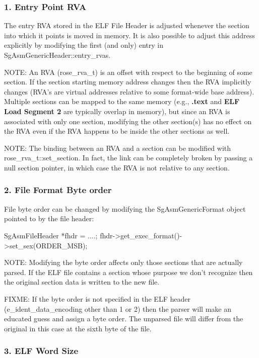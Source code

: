 \subsubsection{1. Entry Point RVA}

   The entry RVA stored in the ELF File Header is adjusted whenever the section into which it points is moved in memory. It is
   also possible to adjust this address explicitly by modifying the first (and only) entry in SgAsmGenericHeader::entry\_rvas.

   NOTE: An RVA (rose\_rva\_t) is an offset with respect to the beginning of some section. If the section starting memory address
   changes then the RVA implicitly changes (RVA's are virtual addresses relative to some format-wide base address). Multiple
   sections can be mapped to the same memory (e.g., {\bf.text} and {\bf ELF Load Segment 2} are typically overlap in memory), but
   since an RVA is associated with only one section, modifying the other section(s) has no effect on the RVA even if the RVA
   happens to be inside the other sections as well.

   NOTE: The binding between an RVA and a section can be modified with rose\_rva\_t::set\_section. In fact, the link can be
   completely broken by passing a null section pointer, in which case the RVA is not relative to any section.

\subsubsection{2. File Format Byte order}

   File byte order can be changed by modifying the SgAsmGenericFormat object pointed to by the file header:

      SgAsmFileHeader *fhdr = ....;
      fhdr->get\_exec\_format()->set\_sex(ORDER\_MSB);

   NOTE: Modifying the byte order affects only those sections that are actually parsed. If the ELF file contains a section
   whose purpose we don't recognize then the original section data is written to the new file.

   FIXME: If the byte order is not specified in the ELF header (e\_ident\_data\_encoding other than 1 or 2) then the parser will
   make an educated guess and assign a byte order.  The unparsed file will differ from the original in this case at the sixth
   byte of the file.

\subsubsection{3. ELF Word Size}

